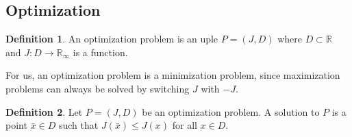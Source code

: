 \documentclass[]{article}
\theoremstyle{definition}
\newtheorem{definition}{Definition}[section]
\theoremstyle{definition}
\newcommand{\raw}{\rightarrow}
\newcommand{\bb}{\mathbb}
\begin{document}
		\subsection{Optimization}
		
		
		\begin{definition}
			An optimization problem is an uple $P = ( J, D )$ where $D \subset \bb{R}$ and $J: D \raw \bb{R}_\infty $ is a function.  
		\end{definition}	

		For us, an optimization problem is a minimization problem, since maximization problems can always be solved by switching $J$ with $-J$.
	
		\begin{definition}
			Let $P = (J, D)$ be an optimization problem. A solution to $P$ is a point $\bar{x} \in D$ such that $J(\bar{x}) \leq J(x)$ for all $x \in D$.
		\end{definition}
	
	
	
	
\end{document}
